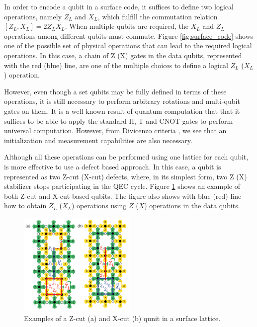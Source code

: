 In order to encode a qubit in a surface code, it suffices to define two logical
operations, namely $Z_L$ and $X_L$, which fulfill the commutation relation
$[Z_L,X_L] = 2Z_LX_L$. When multiple qubits are required, the $X_L$ and $Z_L$
operations among different qubits must commute. Figure \ref{fig:surface_code}
shows one of the possible set of physical operations that can lead to the
required logical operations. In this case, a chain of Z (X) gates in the data
qubits, represented with the red (blue) line, are one of the multiple choices to
define a logical $Z_L$ ($X_L$) operation.

However, even though a set qubits may be fully defined in terms of these
operations, it is still necessary to perform arbitrary rotations and multi-qubit
gates on them. It is a well known result of quantum computation that that it
suffices to be able to apply the standard H, T and CNOT gates to perform
universal computation. However, from Divicenzo criteria
\cite{DiCincenzoCriteria}, we see that an initialization and measurement
capabilities are also necessary.

Although all these operations can be performed using one lattice for each qubit,
is more effective to use a defect based approach. In this case, a qubit is
represented as two Z-cut (X-cut) defects, where, in its simplest form, two Z (X)
stabilizer stops participating in the QEC cycle. Figure \ref{fig:cuts} shows an
example of both Z-cut and X-cut based qubits. The figure also shows with blue
(red) line how to obtain $Z_L$ ($X_L$) operations using $Z$ ($X$) operations in
the data qubits.
\begin{figure}[htbp]
  \centering
  \includegraphics[width=0.5\textwidth]{images/surface_code_cuts.png}
  \caption{Examples of a Z-cut (a) and X-cut (b) qunit in a surface lattice.}
  \label{fig:cuts}
\end{figure}

